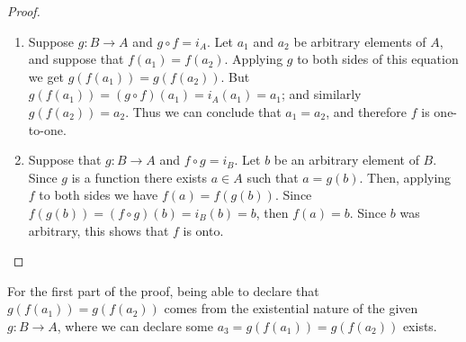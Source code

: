 \documentclass{report}
\theoremstyle{definition}
\begin{document}
\begin{proof}\hspace{1mm}
\begin{enumerate}
\item Suppose $g:B\to A$ and $g\circ f=i_A$. Let $a_1$ and $a_2$ be arbitrary elements of $A$, and suppose that $f(a_1)=f(a_2)$. Applying $g$ to both sides of this equation we get 
$g(f(a_1))=g(f(a_2))$. But $g(f(a_1))=(g\circ f)(a_1)=i_A(a_1)=a_1$; and similarly
$g(f(a_2))=a_2$. Thus we can conclude that $a_1=a_2$, and therefore $f$ is one-to-one.
\item Suppose that $g:B\to A$ and $f\circ g=i_B$. 
Let $b$ be an arbitrary element of $B$. Since $g$ is a function there exists $a\in A$ such that $a=g(b)$. Then, applying $f$ to both sides we have $f(a)=f(g(b))$. Since 
$f(g(b))=(f\circ g)(b)=i_B(b)=b$, then $f(a)=b$. Since $b$ was arbitrary, this shows that $f$ is onto.\qedhere
\end{enumerate}
\end{proof}
\noindent For the first part of the proof, being able to declare that 
$g(f(a_1))=g(f(a_2))$ comes from the existential nature of the given $g:B\to A$, where we can declare some $a_3=g(f(a_1))=g(f(a_2))$ exists.
\newpage
\end{document}
